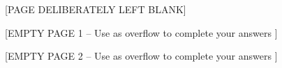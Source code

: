 \documentclass[addpoints]{exam}
\begin{document}
\begin{questions}
  \newpage
\begin{center}
  [PAGE DELIBERATELY LEFT BLANK]
\end{center}
\newpage

	\question[10]
	\begin{solution}
          	\end{solution}

	\question
\fi %

	\newpage
	\begin{center}
		[EMPTY PAGE 1 -- Use as overflow to complete your
                answers ]
	\end{center}

	\newpage
	\begin{center}
		[EMPTY PAGE 2 -- Use as overflow to complete your
                answers ]
              \end{center}

\end{questions}
\end{document}
